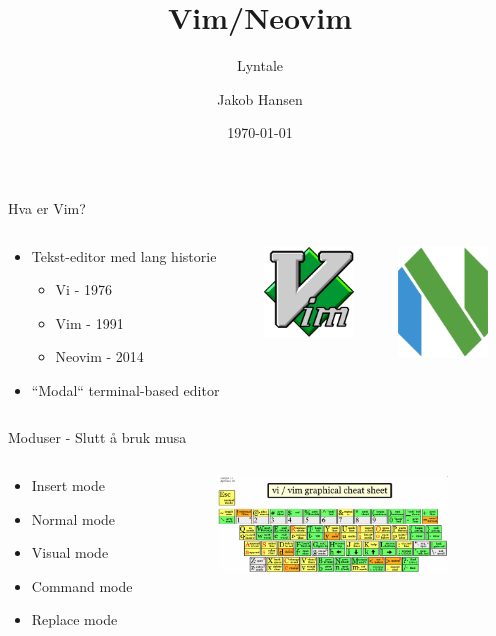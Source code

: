 \documentclass{beamer}
\title{Vim/Neovim}
\subtitle{Lyntale}
\author{Jakob Hansen}
\institute{UiO}
\date{\today}
\begin{document}
\begin{frame}
	\titlepage
\end{frame}
\begin{frame}{Hva er Vim?}
	\begin{columns}
		\begin{column}{0.475\textwidth}
			\begin{itemize}
				\item Tekst-editor med lang historie
				      \begin{itemize}
					      \item Vi - 1976
					      \item Vim - 1991
					      \item Neovim - 2014
				      \end{itemize}
				\item ``Modal`` terminal-based editor
			\end{itemize}
		\end{column}
		\begin{column}{0.25\textwidth}
			{\includegraphics[width=90px]{images/vim-logo-png-transparent.png}}
		\end{column}
		\begin{column}{0.25\textwidth}
			{\includegraphics[width=90px]{images/Neovim-mark-flat.svg.png}}
		\end{column}
	\end{columns}
\end{frame}
\begin{frame}{Moduser - Slutt å bruk musa}
	\begin{columns}
		\begin{column}{0.3\textwidth}
			\begin{itemize}
				\item Insert mode
				\item Normal mode
				\item Visual mode
				\item Command mode
				\item Replace mode
			\end{itemize}
		\end{column}
		\begin{column}{0.7\textwidth}
			{\includegraphics[width=230px]{images/vim-cheat-sheet.png}}
		\end{column}
	\end{columns}
\end{frame}
\end{document}
